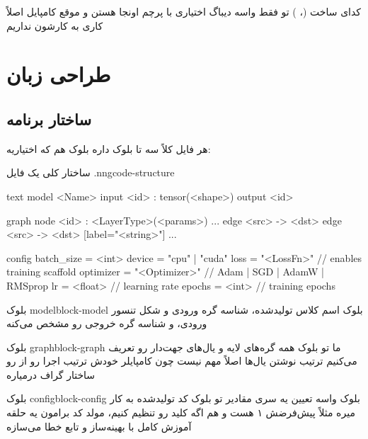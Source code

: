 \documentclass{nngraph-fa}
\begin{document}
\begin{notebox}
کدای ساخت  (، ) تو  فقط واسه دیباگ اختیاری با پرچم  اونجا هستن و موقع کامپایل اصلاً کاری به کارشون نداریم
\end{notebox}

\chapter{طراحی زبان}

\section{ساختار برنامه}

هر فایل  کلاً سه تا بلوک داره
بلوک  هم که اختیاریه:

\begin{codebox}{ساختار کلی یک فایل .nng}{code-structure}
\begin{amzcode}{text}
model <Name> {
    input  <id> : tensor(<shape>)
    output <id>
}

graph {
    node <id> : <LayerType>(<params>)
    ...
    edge <src> -> <dst>
    edge <src> -> <dst> [label="<string>"]
    ...
}

config {
    batch_size = <int>
    device     = "cpu" | "cuda"
    loss       = "<LossFn>"       // enables training scaffold
    optimizer  = "<Optimizer>"    // Adam | SGD | AdamW | RMSprop
    lr         = <float>          // learning rate
    epochs     = <int>            // training epochs
}
\end{amzcode}
\end{codebox}

\begin{dfnbox}{بلوک model}{block-model}
بلوک  اسم کلاس تولیدشده، شناسه گره ورودی و شکل تنسور ورودی، و شناسه گره خروجی رو مشخص می‌کنه
\end{dfnbox}

\begin{dfnbox}{بلوک graph}{block-graph}
ما تو بلوک  همه گره‌های لایه و یال‌های جهت‌دار رو تعریف می‌کنیم
ترتیب نوشتن یال‌ها اصلاً مهم نیست چون کامپایلر خودش ترتیب اجرا رو از رو ساختار گراف درمیاره
\end{dfnbox}

\begin{dfnbox}{بلوک config}{block-config}
بلوک  واسه تعیین یه سری مقادیر تو بلوک  کد تولیدشده به کار میره
مثلاً  پیش‌فرضش ۱ هست و  هم 
اگه کلید  رو تنظیم کنیم، مولد کد برامون یه حلقه آموزش کامل با بهینه‌ساز و تابع خطا می‌سازه
\end{dfnbox}
\end{document}

